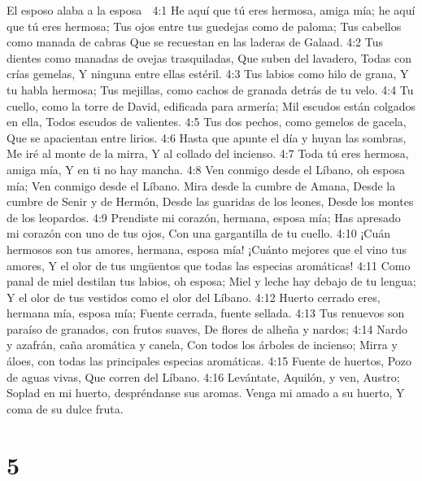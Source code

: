 El esposo alaba a la esposa  

4:1 He aquí que tú eres hermosa, amiga mía; he aquí que tú eres hermosa;  
Tus ojos entre tus guedejas como de paloma;  
Tus cabellos como manada de cabras  
Que se recuestan en las laderas de Galaad.  
4:2 Tus dientes como manadas de ovejas trasquiladas,  
Que suben del lavadero,  
Todas con crías gemelas,  
Y ninguna entre ellas estéril.  
4:3 Tus labios como hilo de grana,  
Y tu habla hermosa;  
Tus mejillas, como cachos de granada detrás de tu velo.  
4:4 Tu cuello, como la torre de David, edificada para armería;  
Mil escudos están colgados en ella,  
Todos escudos de valientes.  
4:5 Tus dos pechos, como gemelos de gacela,  
Que se apacientan entre lirios.  
4:6 Hasta que apunte el día y huyan las sombras,  
Me iré al monte de la mirra,  
Y al collado del incienso.  
4:7 Toda tú eres hermosa, amiga mía,  
Y en ti no hay mancha.  
4:8 Ven conmigo desde el Líbano, oh esposa mía;  
Ven conmigo desde el Líbano.  
Mira desde la cumbre de Amana,  
Desde la cumbre de Senir y de Hermón,  
Desde las guaridas de los leones,  
Desde los montes de los leopardos.  
4:9 Prendiste mi corazón, hermana, esposa mía;  
Has apresado mi corazón con uno de tus ojos,  
Con una gargantilla de tu cuello.  
4:10 ¡Cuán hermosos son tus amores, hermana, esposa mía!  
¡Cuánto mejores que el vino tus amores,  
Y el olor de tus ungüentos que todas las especias aromáticas! 
4:11 Como panal de miel destilan tus labios, oh esposa;  
Miel y leche hay debajo de tu lengua;  
Y el olor de tus vestidos como el olor del Líbano.  
4:12 Huerto cerrado eres, hermana mía, esposa mía;  
Fuente cerrada, fuente sellada.  
4:13 Tus renuevos son paraíso de granados, con frutos suaves,  
De flores de alheña y nardos;  
4:14 Nardo y azafrán, caña aromática y canela,  
Con todos los árboles de incienso;  
Mirra y áloes, con todas las principales especias aromáticas.  
4:15 Fuente de huertos,  
Pozo de aguas vivas,  
Que corren del Líbano.  
4:16 Levántate, Aquilón, y ven, Austro;  
Soplad en mi huerto, despréndanse sus aromas.  
Venga mi amado a su huerto,  
Y coma de su dulce fruta.  

\chapter{5}

